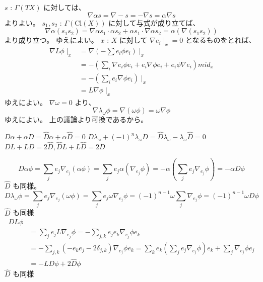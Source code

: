 \begin{Proof}
\itemprof
  \(s\) : \(\Gamma(TX)\) に対しては、
  \[\nabla \alpha s = \nabla - s = -\nabla s = \alpha \nabla s\]
  よりよい。
  \(s_1 , s_2\) : \(\Gamma(\text{Cl}(X))\) に対して与式が成り立てば、
  \[\nabla \alpha (s_1 s_2) = \nabla \alpha s_1 \cdot \alpha s_2 + \alpha s_1 \cdot \nabla \alpha s_2 = \alpha (\nabla (s_1 s_2))\]
  より成り立つ。
  ゆえによい。
\itemprof
  \(x\) : \(X\) に対して \(\nabla e_i \mid_x = 0\) となるものをとれば、
  \begin{align*}
    \nabla L \phi \mid_x
    &= \nabla (- \sum e_i \phi e_i) \mid_x \\
    &= - (\sum_i \nabla e_i \phi e_i + e_i \nabla \phi e_i + e_i \phi \nabla e_i) mid_x \\
    &= - (\sum_i e_i \nabla \phi e_i) \mid_x \\
    &= L \nabla \phi \mid_x
  \end{align*}
  ゆえによい。
\itemprof
  \(\nabla \omega = 0\) より、
  \[\nabla \lambda_{\omega} \phi = \nabla (\omega \phi) = \omega \nabla \phi\]
  ゆえによい。
\itemprof
  上の議論より可換であるから。
\end{Proof}

\begin{Theorem}
\itemprop
  \(D \alpha + \alpha D = \hat{D} \alpha + \alpha \hat{D} = 0\)
\itemprop
  \(D \lambda_{\omega} + (-1)^n \lambda_{\omega} D = \hat{D} \lambda_{\omega} - \lambda_{\omega} \hat{D} = 0\)
\itemprop
  \(D L + L D = 2 \hat{D} , \hat{D} L + L \hat{D} = 2 D\)
\end{Theorem}

\begin{Proof}
\itemprof
  \[
    D \alpha \phi
    = \sum_j e_j \nabla_{e_j} (\alpha \phi) 
    = \sum_j e_j \alpha (\nabla_{e_j} \phi) 
    = - \alpha (\sum_j e_j \nabla_{e_j} \phi) 
    = - \alpha D \phi
  \]
  \(\hat{D}\) も同様。
\itemprof
  \[
    D \lambda_{\omega} \phi
    = \sum_j e_j \nabla_{e_j} (\omega \phi)
    = \sum_j e_j \omega \nabla_{e_j} \phi
    = (-1)^{n-1} \omega \sum_j \nabla_{e_j} \phi
    = (-1)^{n-1} \omega D \phi
  \]
  \(\hat{D}\) も同様
\itemprof
  \begin{align*}
    D L \phi \\
    &= \sum_j e_j L \nabla_{e_j} \phi
    = - \sum_{j,k} e_j e_k \nabla_{e_j} \phi e_k \\
    &= - \sum_{j,k} (- e_k e_j - 2 \delta_{j,k}) \nabla_{e_j} \phi e_k
    = \sum_k e_k (\sum_j e_j \nabla_{e_j} \phi) e_k + \sum_j \nabla_{e_j} \phi e_j \\
    &= - L D \phi + 2 \hat{D} \phi
  \end{align*}
  \(\hat{D}\) も同様
\end{Proof}

